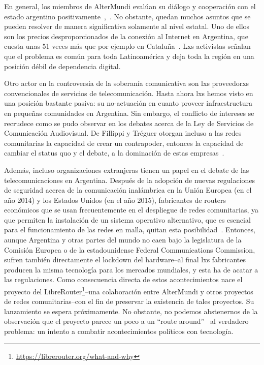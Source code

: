 En general, los miembros de AlterMundi evalúan su diálogo y cooperación con el estado argentino positivamente~\autocite{Vaseva2016a},~\autocite{Piccoli2015}.
No obstante, quedan muchos asuntos que se pueden resolver de manera significativa solamente al nivel estatal.
Uno de ellos son los precios desproporcionados de la conexión al Internet en Argentina, que cuesta unas 51 veces más que por ejemplo en Cataluña~\autocite{Piccoli2015}.
Lxs activistas señalan que el problema es común para toda Latinoamérica y deja toda la región en una posición débil de dependencia digital.

Otro actor en la controversia de la soberanía comunicativa son lxs proveedorxs convencionales de servicios de telecomunicación.
Hasta ahora lxs hemos visto en una posición bastante pasiva: su no-actuación en cuanto proveer infraestructura en pequeñas comunidades en Argentina.
Sin embargo, el conflicto de intereses se recrudece como se pudo observar en los debates acerca de la Ley de Servicios de Comunicación Audiovisual.
De Fillippi y Tréguer otorgan incluso a las redes comunitarias la capacidad de crear un contrapoder, entonces la capacidad de cambiar el status quo y el debate, a la dominación de estas empresas~\autocite{FiTre2015}.

Además, incluso organizaciones extranjeras tienen un papel en el debate de las telecomunicaciones en Argentina.
Después de la adopción de nuevas regulaciones de seguridad acerca de la comunicación inalámbrica en la Unión Europea (en el año 2014) y los Estados Unidos (en el año 2015), fabricantes de routers económicos que se usan frecuentemente en el despliegue de redes comunitarias, ya que permiten la instalación de un sistema operativo alternativo, que es esencial para el funcionamiento de las redes en malla, quitan esta posibilidad~\autocite{Wunderlich2017}.
Entonces, aunque Argentina y otras partes del mundo no caen bajo la legislatura de la Comisión Europea o de la estadounidense Federal Communications Commission, sufren también directamente el lockdown del hardware--al final lxs fabricantes producen la misma tecnología para los mercados mundiales, y esta ha de acatar a las regulaciones.
Como consecuencia directa de estos acontecimientos nace el proyecto del LibreRouter\footnote{\url{https://librerouter.org/what-and-why}}--una colaboración entre AlterMundi y otros proyectos de redes comunitarias--con el fin de preservar la existencia de tales proyectos.
Su lanzamiento se espera próximamente.
No obstante, no podemos abstenernos de la observación que el proyecto parece un poco a un ``route around''~\autocite{Rieder2012} al verdadero problema:
un intento a combatir acontecimientos políticos con tecnología.

